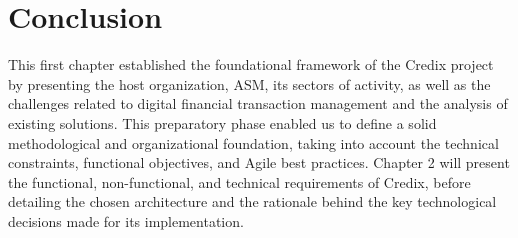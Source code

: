 \section*{Conclusion}

This first chapter established the foundational framework of the Credix project by presenting the host organization, ASM, its sectors of activity, as well as the challenges related to digital financial transaction management and the analysis of existing solutions. This preparatory phase enabled us to define a solid methodological and organizational foundation, taking into account the technical constraints, functional objectives, and Agile best practices.
Chapter 2 will present the functional, non-functional, and technical requirements of Credix, before detailing the chosen architecture and the rationale behind the key technological decisions made for its implementation.
